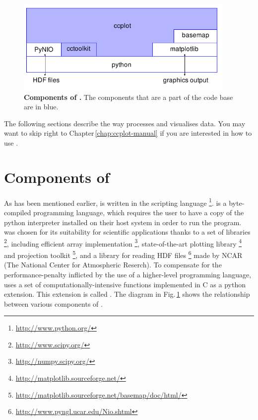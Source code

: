 \begin{figure}[t]
\includegraphics[width=300pt]{images/ccplot-components.pdf}
\caption[Components of \ccplot]{\textbf{Components of \ccplot.} The components that are a
part of the \ccplot code base
are in blue.}
\label{fig:ccplot-components}
\end{figure}

The following sections describe the way \ccplot processes and visualises data.
You may
want to skip right to Chapter\,\ref{chap:ccplot-manual} if you are interested
in how to use \ccplot.


\section{Components of \ccplot}\label{sec:ccplot-components}
As has been mentioned earlier, \ccplot is written in the scripting language
\footnote{\url{http://www.python.org/}}.  is a
byte-compiled programming language,
which requires the user to have a copy of the python interpreter installed on
their host system in order to run the program.  was chosen for
its suitability for scientific applications thanks to a set of libraries
\footnote{\url{http://www.scipy.org/}}, including efficient array
implementation \footnote{\url{http://numpy.scipy.org/}},
state-of-the-art plotting library
\footnote{\url{http://matplotlib.sourceforge.net/}} and
projection toolkit
\footnote{\url{
http://matplotlib.sourceforge.net/basemap/doc/html/}}, and a library for reading
HDF files \footnote{\url{http://www.pyngl.ucar.edu/Nio.shtml}}
made by
NCAR (The National Center for Atmospheric Reserch).
To compensate for the
performance-penalty inflicted by the use of a higher-level programming language,
\ccplot uses a set of computationally-intensive functions implemented in C as a
python extension. This extension is called . The diagram
in Fig.\,\ref{fig:ccplot-components}
shows the relationship between various components of \ccplot.


